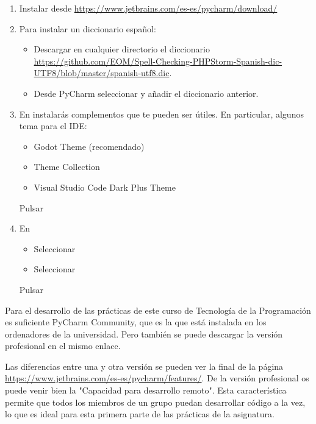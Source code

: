 \begin{enumerate}
\item Instalar  desde \url{https://www.jetbrains.com/es-es/pycharm/download/}
\item Para instalar un diccionario español:
		\begin{itemize}
		\item Descargar en cualquier directorio el diccionario \\
		\url{https://github.com/EOM/Spell-Checking-PHPStorm-Spanish-dic-UTF8/blob/master/spanish-utf8.dic}.
		\item Desde PyCharm seleccionar  y  añadir el diccionario anterior.
		\end{itemize}
		
\item En  instalarás complementos que te pueden ser útiles. En particular, algunos tema para el IDE:
		\begin{itemize}
		\item Godot Theme (recomendado)
		\item Theme Collection
		\item Visual Studio Code Dark Plus Theme
		\end{itemize}

	Pulsar 
\item En 
	\begin{itemize}
	\item Seleccionar \keys{\mbox{+}$_\downarrow$}
	\item Seleccionar 
	\end{itemize}
	Pulsar 
\end{enumerate}


Para el desarrollo de las prácticas de este curso de Tecnología de la Programación es suficiente PyCharm Community, que es la que está instalada en los ordenadores de la universidad. Pero también se puede descargar la versión profesional en el mismo enlace. 

Las diferencias entre una y otra versión se pueden ver la final de la página \url{https://www.jetbrains.com/es-es/pycharm/features/}. De la versión profesional os puede venir bien la "Capacidad para desarrollo remoto". Esta característica permite que todos los miembros de un grupo puedan desarrollar código a la vez, lo que es ideal para esta primera parte de las prácticas de la asignatura.

